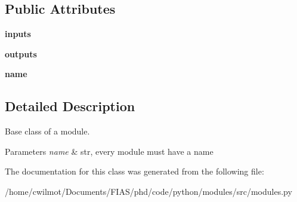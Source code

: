 \subsection*{Public Attributes}
\begin{DoxyCompactItemize}
\item 
\mbox{\label{classmodules_1_1_module_a37837da834db83c1d452514df6741d64}} 
{\bfseries inputs}
\item 
\mbox{\label{classmodules_1_1_module_a3d68775d21b0007ffb804db208e3518e}} 
{\bfseries outputs}
\item 
\mbox{\label{classmodules_1_1_module_adc4d5e494a9ce5c33c684ae4952a4564}} 
{\bfseries name}
\end{DoxyCompactItemize}


\subsection{Detailed Description}
Base class of a module. 


\begin{DoxyParams}{Parameters}
{\em name} & str, every module must have a name \\
\hline
\end{DoxyParams}


The documentation for this class was generated from the following file\+:\begin{DoxyCompactItemize}
\item 
/home/cwilmot/\+Documents/\+F\+I\+A\+S/phd/code/python/modules/src/modules.\+py\end{DoxyCompactItemize}
